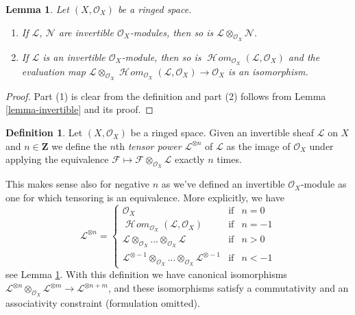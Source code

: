 \documentclass{stacks-project}
\theoremstyle{plain}
\newtheorem{lemma}[subsection]{Lemma}
\theoremstyle{definition}
\newtheorem{definition}[subsection]{Definition}
\theoremstyle{remark}
\numberwithin{equation}{subsection}
\def\SheafHom{\mathop{\mathcal{H}\!\mathit{om}}\nolimits}
\begin{document}
\begin{lemma}
\label{lemma-constructions-invertible}
Let $(X, \mathcal{O}_X)$ be a ringed space.
\begin{enumerate}
\item If $\mathcal{L}$, $\mathcal{N}$ are invertible
$\mathcal{O}_X$-modules, then so is
$\mathcal{L} \otimes_{\mathcal{O}_X} \mathcal{N}$.
\item If $\mathcal{L}$ is an invertible $\mathcal{O}_X$-module, then so is
$\SheafHom_{\mathcal{O}_X}(\mathcal{L}, \mathcal{O}_X)$ and the evaluation map
$\mathcal{L} \otimes_{\mathcal{O}_X}
\SheafHom_{\mathcal{O}_X}(\mathcal{L}, \mathcal{O}_X) \to \mathcal{O}_X$
is an isomorphism.
\end{enumerate}
\end{lemma}

\begin{proof}
Part (1) is clear from the definition and part (2) follows from
Lemma \ref{lemma-invertible} and its proof.
\end{proof}

\begin{definition}
\label{definition-powers}
Let $(X, \mathcal{O}_X)$ be a ringed space. Given an invertible sheaf
$\mathcal{L}$ on $X$ and $n \in \mathbf{Z}$ we define the
$n$th {\it tensor power} $\mathcal{L}^{\otimes n}$ of $\mathcal{L}$
as the image of $\mathcal{O}_X$ under applying the equivalence
$\mathcal{F} \mapsto\mathcal{F} \otimes_{\mathcal{O}_X} \mathcal{L}$
exactly $n$ times.
\end{definition}

\noindent
This makes sense also for negative $n$ as we've defined an invertible
$\mathcal{O}_X$-module as one for which tensoring is an equivalence.
More explicitly, we have
$$
\mathcal{L}^{\otimes n} =
\left\{
\begin{matrix}
\mathcal{O}_X & \text{if} & n = 0 \\
\SheafHom_{\mathcal{O}_X}(\mathcal{L}, \mathcal{O}_X) & \text{if} & n = -1\\
\mathcal{L} \otimes_{\mathcal{O}_X} \ldots \otimes_{\mathcal{O}_X} \mathcal{L}
& \text{if} & n > 0 \\
\mathcal{L}^{\otimes -1} \otimes_{\mathcal{O}_X} \ldots
\otimes_{\mathcal{O}_X} \mathcal{L}^{\otimes -1}
& \text{if} & n < -1
\end{matrix}
\right.
$$
see Lemma \ref{lemma-constructions-invertible}.
With this definition we have canonical isomorphisms
$\mathcal{L}^{\otimes n} \otimes_{\mathcal{O}_X}
\mathcal{L}^{\otimes m} \to
\mathcal{L}^{\otimes n + m}$, and these isomorphisms
satisfy a commutativity and an associativity constraint
(formulation omitted).
\end{document}
